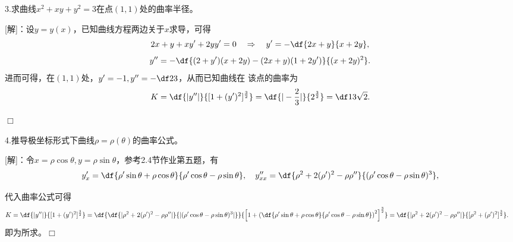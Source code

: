 \bigskip

3.求曲线$x^2+xy+y^2=3$在点$(1,1)$处的曲率半径。

[解]：设$y=y(x)$，已知曲线方程两边关于$x$求导，可得
$$2x+y+xy'+2yy'=0
\quad\Rightarrow\quad
y'=-\df{2x+y}{x+2y},$$
$$y''=-\df{(2+y')(x+2y)-(2x+y)(1+2y')}{(x+2y)^2}.$$
进而可得，在$(1,1)$处，$y'=-1,y''=-\df23$，从而已知曲线在
该点的曲率为
$$K=\df{|y''|}{[1+(y')^2]^{\frac32}}=\df{|-\frac23|}{2^{\frac32}}
=\df1{3\sqrt2}.$$

\hfill$\Box$

\bigskip

4.推导极坐标形式下曲线$\rho=\rho(\theta)$的曲率公式。

[解]：令$x=\rho\cos\theta,y=\rho\sin\theta$，参考2.4节作业第五题，有
$$
	y'_x=\df{\rho'\sin\theta+\rho\cos\theta}
	{\rho'\cos\theta-\rho\sin\theta},
	\quad
	y''_{xx}=\df{\rho^2+2(\rho')^2-\rho\rho''}
	{(\rho'\cos\theta-\rho\sin\theta)^3},
$$

代入曲率公式可得
\begin{align*}
	K&=\df{|y''|}{[1+(y')^2]^{\frac32}}
	=\df{\df{|\rho^2+2(\rho')^2-\rho\rho''|}
	{|(\rho'\cos\theta-\rho\sin\theta)^3|}}
	{\left[1+\left(\df{\rho'\sin\theta+\rho\cos\theta}
	{\rho'\cos\theta-\rho\sin\theta}
	\right)^2\right]^{\frac32}}
	=\df{|\rho^2+2(\rho')^2-\rho\rho''|}
	{[\rho^2+(\rho')^2]^{\frac32}}.
\end{align*}
即为所求。\hfill$\Box$

\fi
